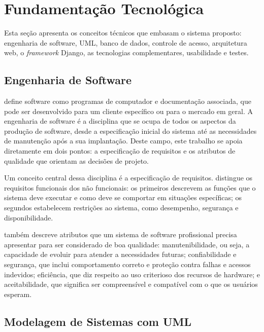 \section{Fundamentação Tecnológica}
\label{sec:fundtec}

Esta seção apresenta os conceitos técnicos que embasam o sistema proposto: engenharia de software, UML, banco de dados, controle de acesso, arquitetura web, o \textit{framework} Django, as tecnologias complementares, usabilidade e testes.

\subsection{Engenharia de Software}
\label{sec:engsw}

 define software como programas de computador e documentação associada, que pode ser desenvolvido para um cliente específico ou para o mercado em geral. A engenharia de software é a disciplina que se ocupa de todos os aspectos da produção de software, desde a especificação inicial do sistema até as necessidades de manutenção após a sua implantação. Deste campo, este trabalho se apoia diretamente em dois pontos: a especificação de requisitos e os atributos de qualidade que orientam as decisões de projeto.

Um conceito central dessa disciplina é a especificação de requisitos.  distingue os requisitos funcionais dos não funcionais: os primeiros descrevem as funções que o sistema deve executar e como deve se comportar em situações específicas; os segundos estabelecem restrições ao sistema, como desempenho, segurança e disponibilidade.

 também descreve atributos que um sistema de software profissional precisa apresentar para ser considerado de boa qualidade: manutenibilidade, ou seja, a capacidade de evoluir para atender a necessidades futuras; confiabilidade e segurança, que inclui comportamento correto e proteção contra falhas e acessos indevidos; eficiência, que diz respeito ao uso criterioso dos recursos de hardware; e aceitabilidade, que significa ser compreensível e compatível com o que os usuários esperam.

\subsection{Modelagem de Sistemas com UML}
\label{sec:uml}

